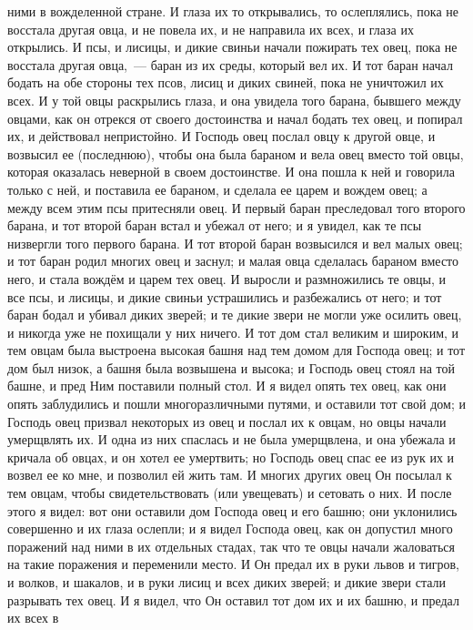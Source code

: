 ними в вожделенной стране.
И глаза их то открывались, то ослеплялись, пока не восстала другая
овца, и не повела их, и не направила их всех, и глаза их открылись.
И псы, и лисицы, и дикие свиньи начали пожирать тех овец, пока не
восстала другая овца,~--- баран из их среды, который вел их.
И тот баран начал бодать на обе стороны тех псов, лисиц и диких
свиней, пока не уничтожил их всех.
И у той овцы раскрылись глаза, и она увидела того барана, бывшего
между овцами, как он отрекся от своего достоинства и начал бодать тех овец, и
попирал их, и действовал непристойно.
И Господь овец послал овцу к другой овце, и возвысил ее (последнюю),
чтобы она была бараном и вела овец вместо той овцы, которая оказалась неверной
в своем достоинстве.
И она пошла к ней и говорила только с ней, и поставила ее бараном, и
сделала ее царем и вождем овец; а между всем этим псы притесняли овец.
И первый баран преследовал того второго барана, и тот второй баран
встал и убежал от него; и я увидел, как те псы низвергли того первого барана.
И тот второй баран возвысился и вел малых овец; и тот баран родил
многих овец и заснул; и малая овца сделалась бараном вместо него, и стала
вождём и царем тех овец.
И выросли и размножились те овцы, и все псы, и лисицы, и дикие свиньи
устрашились и разбежались от него; и тот баран бодал и убивал диких зверей; и
те дикие звери не могли уже осилить овец, и никогда уже не похищали у них
ничего.
И тот дом стал великим и широким, и тем овцам была выстроена высокая
башня над тем домом для Господа овец; и тот дом был низок, а башня была
возвышена и высока; и Господь овец стоял на той башне, и пред Ним поставили
полный стол.
И я видел опять тех овец, как они опять заблудились и пошли
многоразличными путями, и оставили тот свой дом; и Господь овец призвал
некоторых из овец и послал их к овцам, но овцы начали умерщвлять их.
И одна из них спаслась и не была умерщвлена, и она убежала и кричала
об овцах, и он хотел ее умертвить; но Господь овец спас ее из рук их и возвел
ее ко мне, и позволил ей жить там.
И многих других овец Он посылал к тем овцам, чтобы свидетельствовать
(или увещевать) и сетовать о них.
И после этого я видел: вот они оставили дом Господа овец и его башню;
они уклонились совершенно и их глаза ослепли; и я видел Господа овец, как он
допустил много поражений над ними в их отдельных стадах, так что те овцы начали
жаловаться на такие поражения и переменили место.
И Он предал их в руки львов и тигров, и волков, и шакалов, и в руки
лисиц и всех диких зверей; и дикие звери стали разрывать тех овец.
И я видел, что Он оставил тот дом их и их башню, и предал их всех в
